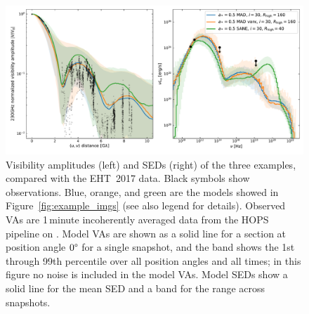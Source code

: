 
\begin{figure}
  \centering
  \includegraphics[width=\textwidth]{figures/example_vas_seds.pdf}
  \caption{Visibility amplitudes (left) and SEDs (right) of the three examples, compared with the EHT~2017 data.  Black symbols show observations.  Blue, orange, and green are the models showed in Figure~\ref{fig:example_imgs} (see also legend for details).  Observed VAs are 1\,minute incoherently averaged data from the HOPS pipeline on \aprilvii.  Model VAs are shown as a solid line for a section at position angle $0\degree$ for a single snapshot, and the band shows the 1st through 99th percentile over all position angles and all times; in this figure no noise is included in the model VAs.  Model SEDs show a solid line for the mean SED and a band for the range across snapshots.}
  \label{fig:example_vas_seds}
\end{figure}

